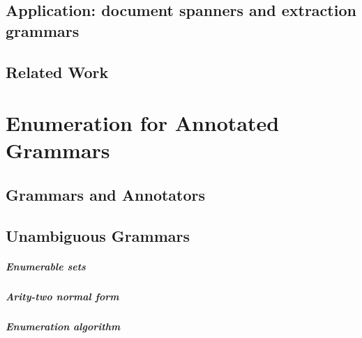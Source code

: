 \documentclass[pdftex]{pucthesis}	%
\begin{document}
\section{Application: document spanners and extraction grammars}\label{nested:sec:spanners}


\section{Related Work}\label{nested:relwork}





\chapter[ENUMERATION FOR ANNOTATED GRAMMARS]{Enumeration for Annotated Grammars} \label{ch2}



\section{Grammars and Annotators}\label{gram:sec:models}



\section{Unambiguous Grammars} \label{gram:sec:cubic}



\paragraph{Enumerable sets}


\paragraph{Arity-two normal form}


\paragraph{Enumeration algorithm}

\end{document}
